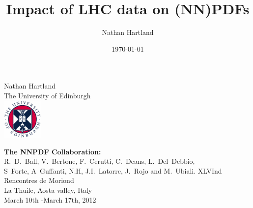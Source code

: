 \documentclass[10pt]{beamer}
\title[]{Impact of LHC data on (NN)PDFs}
\author{Nathan Hartland}
\institute
{
University of Edinburgh\\
\medskip
}
\date{\today}
\newcommand{\vso}{\vskip15pt}
\begin{document}
\renewcommand{\inserttotalframenumber}{14}


\begin{frame}
\begin{centering}
\vskip20pt
\vskip20pt
Nathan Hartland\\

\small{The University of Edinburgh}\\
\vso
\includegraphics[height=2cm]{edinburghcrest.pdf}

\vskip10pt
{\bf The NNPDF Collaboration:}\\
R.~D.~Ball, V.~Bertone, F.~Cerutti,
C.~Deans, L.~Del~Debbio, \\S~Forte,
A~Guffanti, N.H, J.I.~Latorre, J.~Rojo and M.~Ubiali. 
\vskip20pt
XLVInd Rencontres de Moriond\\
La Thuile, Aosta valley, Italy\\
March 10th -March 17th, 2012


\end{centering}

\end{frame}
\end{document}
